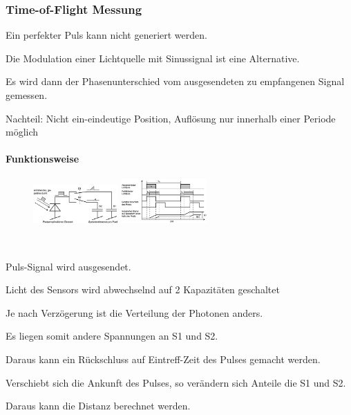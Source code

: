 \subsubsection{Time-of-Flight Messung}
\begin{compactitem}
    \item Ein perfekter Puls kann nicht generiert werden.
    \item Die Modulation einer Lichtquelle mit Sinussignal ist eine Alternative. 
    \item Es wird dann der Phasenunterschied vom ausgesendeten zu empfangenen Signal gemessen.
    \item Nachteil: Nicht ein-eindeutige Position, Auflösung nur innerhalb einer Periode möglich
\end{compactitem}

\paragraph{Funktionsweise}
\begin{figure}
    \centering
    \includegraphics[width=0.29\textwidth]{images/tof_fkt_01}
    \includegraphics[width=0.29\textwidth]{images/tof_fkt_02}
\end{figure}
\ 
\vspace{-5pt}
\begin{compactenum}
    \item Puls-Signal wird ausgesendet.
    \item Licht des Sensors wird abwechselnd auf 2 Kapazitäten geschaltet
    \item Je nach Verzögerung ist die Verteilung der Photonen anders.
    \item Es liegen somit andere Spannungen an S1 und S2.
    \item Daraus kann ein Rückschluss auf Eintreff-Zeit des Pulses gemacht werden.
    \item Verschiebt sich die Ankunft des Pulses, so verändern sich Anteile die S1 und S2.
    \item Daraus kann die Distanz berechnet werden. \\
\end{compactenum}

